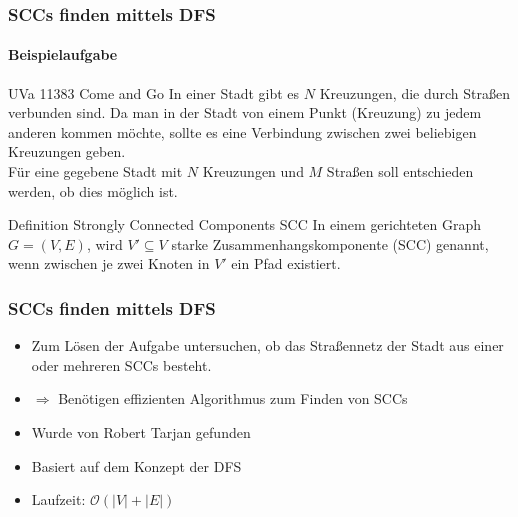 \begin{frame}
	\frametitle{SCCs finden mittels DFS}
	\framesubtitle{Beispielaufgabe}
	\begin{KITexampleblock}{UVa 11383 Come and Go}
		In einer Stadt gibt es $N$  Kreuzungen, die durch Straßen verbunden sind.
		Da man in der Stadt von einem Punkt (Kreuzung) zu jedem anderen kommen möchte, sollte es eine Verbindung zwischen zwei beliebigen Kreuzungen geben. \\
		Für eine gegebene Stadt mit $N$ Kreuzungen und $M$ Straßen soll entschieden werden, ob dies möglich ist.
			
	\end{KITexampleblock}
	\pause 
	\bigskip
	
	\begin{KITinfoblock}{Definition Strongly Connected Components SCC}
		In einem gerichteten Graph $G = (V,E)$, wird $V' \subseteq V$ starke Zusammenhangskomponente (SCC) genannt, wenn zwischen je zwei Knoten in $V'$ ein Pfad existiert.
	\end{KITinfoblock}
	
	
\end{frame}

\begin{frame}
	\frametitle{SCCs finden mittels DFS}
	\begin{itemize}
		\item Zum Lösen der Aufgabe untersuchen, ob das Straßennetz der Stadt aus einer oder mehreren SCCs besteht.
		\item $\Rightarrow$ Benötigen effizienten Algorithmus zum Finden von SCCs 
	\end{itemize}	
	\pause
	\begin{itemize}
		\item Wurde von Robert Tarjan gefunden
		\item Basiert auf dem Konzept der DFS
		\item Laufzeit: $\mathcal{O}(|V| + |E|)$
	\end{itemize}
\end{frame}

